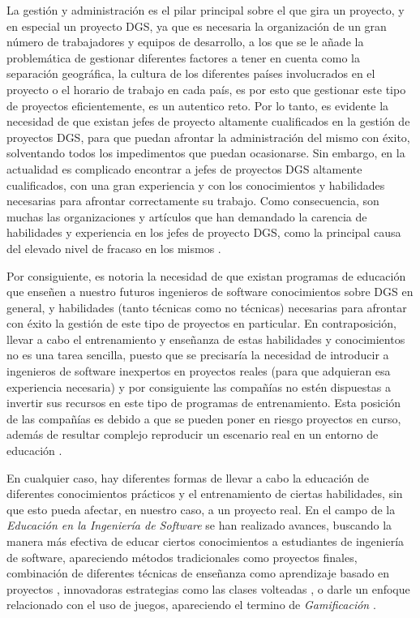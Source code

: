 La gestión y administración es el pilar principal sobre el que gira un proyecto, y en especial un proyecto DGS, ya que es necesaria la organización de un gran número de trabajadores y equipos de desarrollo, a los que se le añade la problemática de gestionar diferentes factores a tener en cuenta como la separación geográfica, la cultura de los diferentes países involucrados en el proyecto o el horario de trabajo en cada país, es por esto que gestionar este tipo de proyectos eficientemente, es un autentico reto. Por lo tanto, es evidente la necesidad de que existan jefes de proyecto altamente cualificados en la gestión de proyectos DGS, para que puedan afrontar la administración del mismo con éxito, solventando todos los impedimentos que puedan ocasionarse. Sin embargo, en la actualidad es complicado encontrar a jefes de proyectos DGS altamente cualificados, con una gran experiencia y con los conocimientos y habilidades necesarias para afrontar correctamente su trabajo. Como consecuencia, son muchas las organizaciones y artículos que han demandado la carencia de habilidades y experiencia en los jefes de proyecto DGS, como la principal causa del elevado nivel de fracaso en los mismos \cite{lino2015project}.

Por consiguiente, es notoria la necesidad de que existan programas de educación que enseñen a nuestro futuros ingenieros de software conocimientos sobre DGS en general, y habilidades (tanto técnicas como no técnicas) necesarias para afrontar con éxito la gestión de este tipo de proyectos en particular. En contraposición, llevar a cabo el entrenamiento y enseñanza de estas habilidades y conocimientos no es una tarea sencilla, puesto que se precisaría la necesidad de introducir a ingenieros de software inexpertos en proyectos reales (para que adquieran esa experiencia necesaria) y por consiguiente las compañías no estén dispuestas a invertir sus recursos en este tipo de programas de entrenamiento. Esta posición de las compañías es debido a que se pueden poner en riesgo proyectos en curso, además de resultar complejo reproducir un escenario real en un entorno de educación \cite{monasor2010preparing}.

En cualquier caso, hay diferentes formas de llevar a cabo la educación de diferentes conocimientos prácticos y el entrenamiento de ciertas habilidades, sin que esto pueda afectar, en nuestro caso, a un proyecto real. En el campo de la \emph{Educación en la Ingeniería de Software} se han realizado avances, buscando la manera más efectiva de educar ciertos conocimientos a estudiantes de ingeniería de software, apareciendo métodos tradicionales como proyectos finales, combinación de diferentes técnicas de enseñanza como aprendizaje basado en proyectos \cite{alabbadi2016proposed}, innovadoras estrategias como las clases volteadas \cite{choi2013applying}, o darle un enfoque relacionado con el uso de juegos, apareciendo el termino de \emph{Gamificación} \cite{connolly2007application}.

